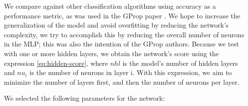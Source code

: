 \documentclass[runningheads]{llncs}
\begin{document}

We compare against other classification algorithms using accuracy as a
performance metric, as was used in the GProp paper \cite{castilloNC,CastilloNPL}. We hope to
increase the generalization of the model and avoid overfitting by reducing the
network's complexity, we try to accomplish this by reducing the
overall number of neurons in the MLP; this was also the intention of the GProp
authors. Because we test with one or more hidden layers, we obtain the network's
score using the expression \ref{eq:hidden-score}, where $nhl$ is the model's
number of hidden layers and $nu_{i}$ is the number of neurons in layer {i}. With
this expression, we aim to minimize the number of layers first, and then the number of
neurons per layer.



We selected the following parameters for the network:
\end{document}
